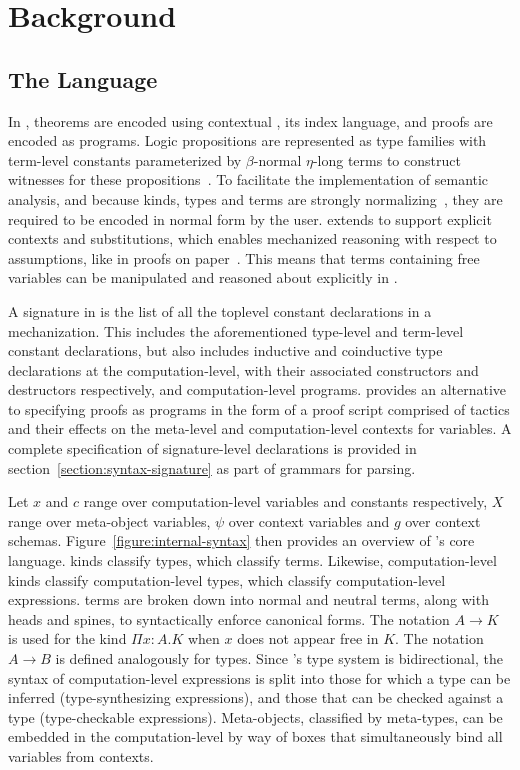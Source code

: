 \chapter{Background}

\section{The \Beluga Language}

In \Beluga, theorems are encoded using contextual \LF, its index language, and proofs are encoded as programs.
Logic propositions are represented as \LF type families with term-level constants parameterized by $\beta$-normal $\eta$-long \LF terms to construct witnesses for these propositions~\cite{nanevski2008contextual, foundation2008pientka, DBLP:journals/corr/abs-1009-2789}.
To facilitate the implementation of semantic analysis, and because \LF kinds, types and terms are strongly normalizing~\cite{harper1993framework}, they are required to be encoded in normal form by the user.
\Beluga extends \LF to support explicit contexts and substitutions, which enables mechanized reasoning with respect to assumptions, like in proofs on paper~\cite{pientka2010programming}.
This means that terms containing free variables can be manipulated and reasoned about explicitly in \Beluga.

A signature in \Beluga is the list of all the toplevel constant declarations in a mechanization.
This includes the aforementioned \LF type-level and term-level constant declarations, but also includes inductive and coinductive type declarations at the computation-level, with their associated constructors and destructors respectively, and computation-level programs.
\Harpoon provides an alternative to specifying proofs as programs in the form of a proof script comprised of tactics and their effects on the meta-level and computation-level contexts for variables.
A complete specification of signature-level declarations is provided in section~\ref{section:syntax-signature} as part of grammars for parsing.


Let $x$ and $c$ range over computation-level variables and constants respectively, $X$ range over meta-object variables, $\psi$ over context variables and $g$ over context schemas.
Figure~\ref{figure:internal-syntax} then provides an overview of \Beluga's core language.
\LF kinds classify \LF types, which classify \LF terms.
Likewise, computation-level kinds classify computation-level types, which classify computation-level expressions.
\LF terms are broken down into normal and neutral terms, along with heads and spines, to syntactically enforce canonical forms.
The notation $A \to K$ is used for the \LF kind $\Pi x{:}A. K$ when $x$ does not appear free in $K$.
The notation $A \to B$ is defined analogously for \LF types.
Since \Beluga's type system is bidirectional, the syntax of computation-level expressions is split into those for which a type can be inferred (type-synthesizing expressions), and those that can be checked against a type (type-checkable expressions).
Meta-objects, classified by meta-types, can be embedded in the computation-level by way of boxes that simultaneously bind all variables from \LF contexts.

